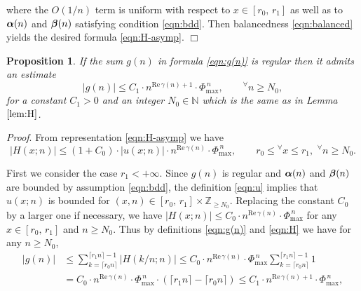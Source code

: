 \documentclass[a4paper,12pt]{article}
\theoremstyle{plain}
\newtheorem{proposition}[theorem]{Proposition}
\def\rRe{\mathrm{Re}}
\def\N{\mathbb{N}}
\def\Z{\mathbb{Z}}
\def\bal{\mbox{\boldmath $\alpha$}}
\def\bbeta{\mbox{\boldmath $\beta$}}
\def\Phim{\Phi_{\scriptstyle \mathrm{max}}}
\begin{document}
where the $O(1/n)$ term is uniform with respect to $x \in [r_0, \, r_1]$ as 
well as to $\bal(n)$ and $\bbeta(n)$ satisfying condition \eqref{eqn:bdd}.  
Then balancedness \eqref{eqn:balanced} yields the desired 
formula \eqref{eqn:H-asymp}. \hfill $\Box$ 
\begin{proposition} \label{prop:reg-bd} 
If the sum $g(n)$ in formula \eqref{eqn:g(n)} is regular then it admits an estimate  
\begin{equation*} 
|g(n)| \le C_1 \cdot n^{\rRe \, \gamma(n) + 1} \cdot \Phim^{\, n}, \qquad 
{}^{\forall} n \ge N_0,   
\end{equation*} 
for a constant $C_1 > 0$ and an integer $N_0 \in \N$ which is the same as in 
Lemma $\ref{lem:H}$.    
\end{proposition} 
{\it Proof}. 
From representation \eqref{eqn:H-asymp} we have 
\begin{equation} \label{eqn:reg-bd-es1}
|H(x; n)| \le (1+C_0) \cdot 
|u(x; n)|\cdot n^{\rRe \, \gamma(n)} \cdot \Phim^{\, n}, \qquad  
r_0 \le {}^{\forall} x \le r_1, \,\, {}^{\forall} n \ge N_0.  
\end{equation}
\par
First we consider the case $r_1 < + \infty$. 
Since $g(n)$ is regular and $\bal(n)$ and $\bbeta(n)$ are bounded by 
assumption \eqref{eqn:bdd}, the definition \eqref{eqn:u} implies that $u(x; n)$ 
is bounded for $(x, n) \in [r_0, \, r_1] \times \Z_{\ge N_0}$. 
Replacing the constant $C_0$ by a larger one if necessary, we have 
$|H(x; n)| \le C_0 \cdot n^{\rRe \, \gamma(n)} 
\cdot \Phim^{\, n}$ for any $x \in [r_0, \, r_1]$ and $n \ge N_0$. 
Thus by definitions \eqref{eqn:g(n)} and \eqref{eqn:H} we have for any 
$n \ge N_0$,   
\begin{align*}
|g(n)| & \le \sum_{k=\lceil r_0 n \rceil}^{\lceil r_1 n \rceil -1} |H(k/n; n)| 
\le C_0 \cdot n^{\rRe \, \gamma(n)} \cdot \Phim^{\, n} 
\sum_{k=\lceil r_0 n \rceil}^{\lceil r_1 n \rceil -1} 1 \\ 
& = C_0 \cdot n^{\rRe \, \gamma(n)} \cdot \Phim^{\, n} \cdot 
(\lceil r_1 n \rceil - \lceil r_0 n \rceil) 
\le C_1 \cdot n^{\rRe \, \gamma(n) + 1} \cdot \Phim^{\, n},  
\end{align*}
\end{document}
